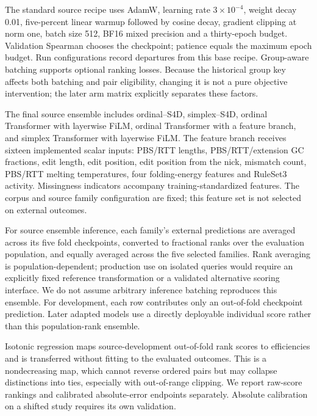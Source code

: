 The standard source recipe uses AdamW, learning rate $3\times10^{-4}$, weight decay 0.01, five-percent linear warmup followed by cosine decay, gradient clipping at norm one, batch size 512, BF16 mixed precision and a thirty-epoch budget. Validation Spearman chooses the checkpoint; patience equals the maximum epoch budget. Run configurations record departures from this base recipe. Group-aware batching supports optional ranking losses. Because the historical group key affects both batching and pair eligibility, changing it is not a pure objective intervention; the later arm matrix explicitly separates these factors.

The final source ensemble includes ordinal--S4D, simplex--S4D, ordinal Transformer with layerwise FiLM, ordinal Transformer with a feature branch, and simplex Transformer with layerwise FiLM. The feature branch receives sixteen implemented scalar inputs: PBS/RTT lengths, PBS/RTT/extension GC fractions, edit length, edit position, edit position from the nick, mismatch count, PBS/RTT melting temperatures, four folding-energy features and RuleSet3 activity. Missingness indicators accompany training-standardized features. The corpus and source family configuration are fixed; this feature set is not selected on external outcomes.

For source ensemble inference, each family's external predictions are averaged across its five fold checkpoints, converted to fractional ranks over the evaluation population, and equally averaged across the five selected families. Rank averaging is population-dependent; production use on isolated queries would require an explicitly fixed reference transformation or a validated alternative scoring interface. We do not assume arbitrary inference batching reproduces this ensemble. For development, each row contributes only an out-of-fold checkpoint prediction. Later adapted models use a directly deployable individual score rather than this population-rank ensemble.

Isotonic regression maps source-development out-of-fold rank scores to efficiencies and is transferred without fitting to the evaluated outcomes. This is a nondecreasing map, which cannot reverse ordered pairs but may collapse distinctions into ties, especially with out-of-range clipping. We report raw-score rankings and calibrated absolute-error endpoints separately. Absolute calibration on a shifted study requires its own validation.

